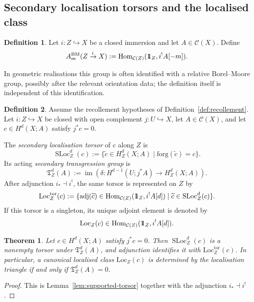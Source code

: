 \documentclass[10pt,a4paper,dvipsnames,x11names]{amsart}
\newcommand{\one}{1\hskip-3.5pt1}
\newcommand{\C}{\mathcal C}
\newcommand{\Hom}{\mathrm{Hom}}
\newcommand{\forg}{\mathrm{forg}}
\newcommand{\Loc}{\mathrm{Loc}}
\newcommand{\BM}{\mathrm{BM}}
\newcommand{\SLoc}{\operatorname{SLoc}}
\newcommand{\TLoc}{\mathfrak T}
\numberwithin{equation}{section}
\theoremstyle{plain}
\newtheorem{theorem}{Theorem}[section]
\theoremstyle{definition}
\newtheorem{definition}[definition]{Definition}
\theoremstyle{remark}
\begin{document}
\subsection{Secondary localisation torsors and the localised class}

\begin{definition} \label{def:BM-rel}
Let $i:Z\hookrightarrow X$ be a closed immersion and let $A\in\C(X)$. Define
\[
A^{\BM}_m(Z\xrightarrow{i}X):=\Hom_{\C(Z)}(\one_Z,i^!A[-m]).
\]
\end{definition}

In geometric realisations this group is often identified with a relative Borel--Moore group, possibly after the relevant orientation data; the definition itself is independent of this identification.

\begin{definition}\label{def:LocZ}
Assume the recollement hypotheses of Definition~\ref{def:recollement}. Let $i:Z\hookrightarrow X$ be closed with open complement $j:U\hookrightarrow X$, let $A\in\C(X)$, and let $c\in H^d(X;A)$ satisfy $j^*c=0$.

The \emph{secondary localisation torsor} of $c$ along $Z$ is
\[
\SLoc_Z^d(c)
:=
\{\widetilde c\in H_Z^d(X;A)\mid \forg(\widetilde c)=c\}.
\]
Its acting \emph{secondary transgression group} is
\[
\TLoc_Z^d(A)
:=
\operatorname{im}\!\left(
\delta:H^{d-1}(U;j^*A)\longrightarrow H_Z^d(X;A)
\right).
\]
After adjunction $i_*\dashv i^!$, the same torsor is represented on $Z$ by
\[
\Loc_Z^{\mathrm{tor}}(c)
:=
\{\operatorname{adj}(\widetilde c)\in\Hom_{\C(Z)}(\one_Z,i^!A[d])\mid \widetilde c\in\SLoc_Z^d(c)\}.
\]
If this torsor is a singleton, its unique adjoint element is denoted by
\[
\Loc_Z(c)\in\Hom_{\C(Z)}(\one_Z,i^!A[d]).
\]
\end{definition}

\begin{theorem}\label{thm:Loc-factor}
Let $c\in H^d(X;A)$ satisfy $j^*c=0$. Then $\SLoc_Z^d(c)$ is a nonempty torsor under $\TLoc_Z^d(A)$, and adjunction identifies it with $\Loc_Z^{\mathrm{tor}}(c)$. In particular, a canonical localised class $\Loc_Z(c)$ is determined by the localisation triangle if and only if $\TLoc_Z^d(A)=0$.
\end{theorem}

\begin{proof}
This is Lemma~\ref{lem:supported-torsor} together with the adjunction $i_*\dashv i^!$.
\end{proof}
\end{document}
